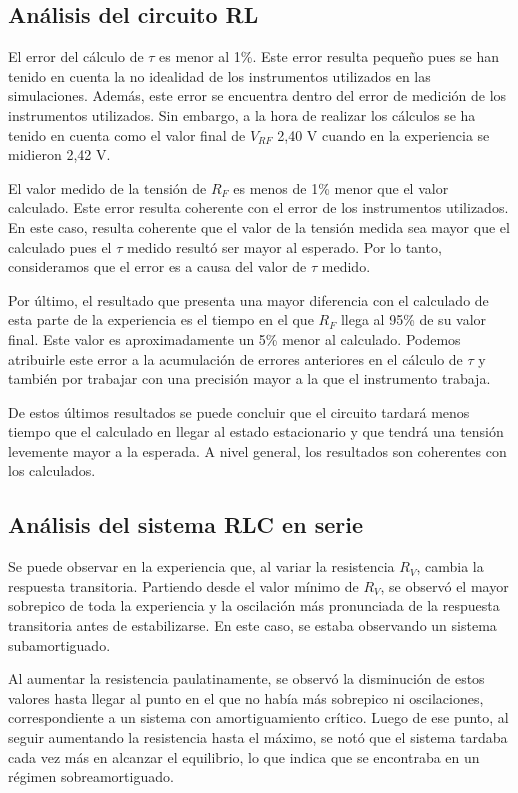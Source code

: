 \subsection{Análisis del circuito RL}
El error del cálculo de $\tau$ es menor al 1\%. Este error resulta pequeño pues se han tenido en cuenta la no idealidad de los instrumentos utilizados en las simulaciones. Además, este error se encuentra dentro del error de medición de los instrumentos utilizados. Sin embargo, a la hora de realizar los cálculos se ha tenido en cuenta como el valor final de $V_{RF}$ 2,40 V cuando en la experiencia se midieron 2,42 V. 

El valor medido de la tensión de $R_F$ es menos de 1\% menor que el valor calculado. Este error resulta coherente con el error de los instrumentos utilizados. En este caso, resulta coherente que el valor de la tensión medida sea mayor que el calculado pues el $\tau$ medido resultó ser mayor al esperado. Por lo tanto, consideramos que el error es a causa del valor de $\tau$ medido.

Por último, el resultado que presenta una mayor diferencia con el calculado de esta parte de la experiencia es el tiempo en el que $R_F$ llega al 95\% de su valor final. Este valor es aproximadamente un 5\% menor al calculado. Podemos atribuirle este error a la acumulación de errores anteriores en el cálculo de $\tau$ y también por trabajar con una precisión mayor a la que el instrumento trabaja.

De estos últimos resultados se puede concluir que el circuito tardará menos tiempo que el calculado en llegar al estado estacionario y que tendrá una tensión levemente mayor a la esperada. A nivel general, los resultados son coherentes con los calculados.

\subsection{Análisis del sistema RLC en serie}
Se puede observar en la experiencia que, al variar la resistencia $R_V$, cambia la respuesta transitoria. Partiendo desde el valor mínimo de $R_V$, se observó el mayor sobrepico de toda la experiencia y la oscilación más pronunciada de la respuesta transitoria antes de estabilizarse. En este caso, se estaba observando un sistema subamortiguado.

Al aumentar la resistencia paulatinamente, se observó la disminución de estos valores hasta llegar al punto en el que no había más sobrepico ni oscilaciones, correspondiente a un sistema con amortiguamiento crítico. Luego de ese punto, al seguir aumentando la resistencia hasta el máximo, se notó que el sistema tardaba cada vez más en alcanzar el equilibrio, lo que indica que se encontraba en un régimen sobreamortiguado.

